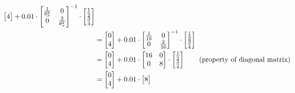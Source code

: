 \documentclass{exam}
\begin{document}
\begin{enumerate}
\begin{solutionorlines}[2in]
\begin{align*}
\begin{bmatrix}
                 4
                \end{bmatrix} + 0.01 \cdot 
               \begin{bmatrix}
                    \frac{1}{\theta_{\sigma}^2}
                    & 0\\
                    0 
                    & \frac{2}{\theta_{\sigma}^2}
                \end{bmatrix}^{-1} \cdot
                \begin{bmatrix}
                \frac{1}{2} \\
                \frac{3}{4}
                \end{bmatrix} \\
                &= \begin{bmatrix}
                0\\
                 4
                \end{bmatrix} + 0.01 \cdot 
                \begin{bmatrix}
                \frac{1}{16}  & 0\\
                0  & \frac{2}{16}
                \end{bmatrix}^{-1} \cdot
                \begin{bmatrix}
                \frac{1}{2} \\
                \frac{3}{4}
                \end{bmatrix}\\
                &= \begin{bmatrix}
                0\\
                4
                \end{bmatrix} + 0.01 \cdot 
                \begin{bmatrix}
                16  & 0\\
                0  & 8
                \end{bmatrix} \cdot
                \begin{bmatrix}
                \frac{1}{2} \\
                \frac{3}{4}
                \end{bmatrix} \tag{property of diagonal matrix}\\
                &= \begin{bmatrix}
                0\\
                4
                \end{bmatrix} + 0.01 \cdot 
                \begin{bmatrix}
                8\\

\end{bmatrix}
\end{align*}
\end{solutionorlines}
\end{enumerate}
\end{document}
